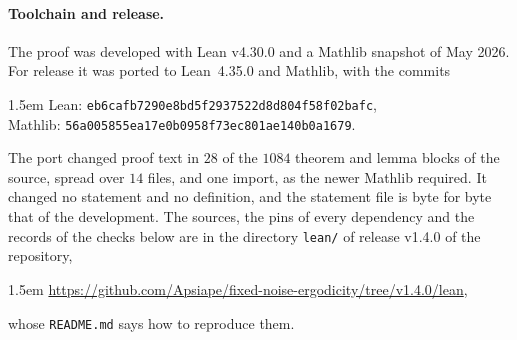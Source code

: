 \paragraph{Toolchain and release.} The proof was developed with Lean v4.30.0 and a Mathlib snapshot of May 2026. For release it was ported to Lean~4.35.0 and Mathlib, with the commits
\begin{flushleft}\small\leftskip1.5em
Lean: \nolinkurl{eb6cafb7290e8bd5f2937522d8d804f58f02bafc},\\
Mathlib: \nolinkurl{56a005855ea17e0b0958f73ec801ae140b0a1679}.
\end{flushleft}
The port changed proof text in $28$ of the $1084$ theorem and lemma blocks of the source, spread over $14$ files, and one import, as the newer Mathlib required. It changed no statement and no definition, and the statement file is byte for byte that of the development. The sources, the pins of every dependency and the records of the checks below are in the directory \texttt{lean/} of release v1.4.0 of the repository,
\begin{flushleft}\small\leftskip1.5em
\url{https://github.com/Apsiape/fixed-noise-ergodicity/tree/v1.4.0/lean},
\end{flushleft}
whose \texttt{README.md} says how to reproduce them.
